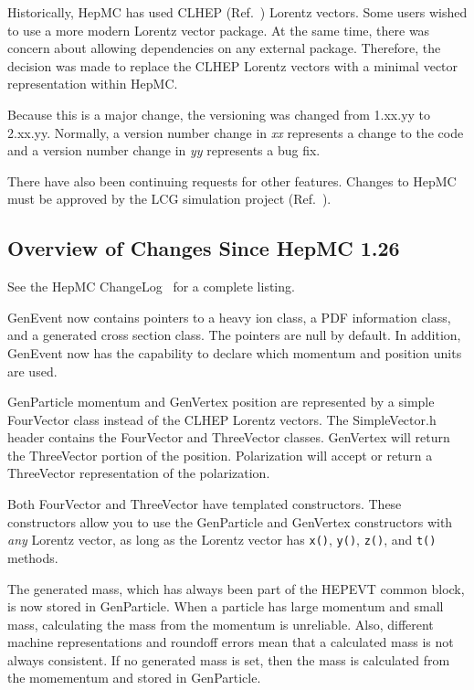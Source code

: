 \documentclass[11pt,letterpaper]{article}
\begin{document}
Historically, HepMC has used CLHEP (Ref.~\cite{clhep}) Lorentz vectors.  Some users wished to use
a more modern Lorentz vector package.  At the same time, 
there was concern about allowing dependencies on any external package.  
Therefore, the decision was made to replace the CLHEP Lorentz vectors with
a minimal vector representation within HepMC.  

Because this is a major change, the versioning was changed 
from 1.xx.yy to 2.xx.yy.  Normally, a version number change in \emph{xx} 
represents a change to the code and a version number change in \emph{yy}
represents a bug fix.

There have also been continuing requests for other features.
Changes to HepMC must be approved by the LCG simulation project 
(Ref.~\cite{lcgsim}).  

%
%

\subsection{Overview of Changes Since HepMC 1.26}

See the HepMC ChangeLog~\cite{changelog} for a complete listing.

GenEvent now contains pointers to a heavy ion class, a PDF information class,
and a generated cross section class.
The pointers are null by default.  
In addition, GenEvent now has the capability to declare which
momentum and position units are used.

GenParticle momentum and GenVertex position are represented by a simple FourVector 
class instead of the CLHEP Lorentz vectors.  
The SimpleVector.h header contains the FourVector and ThreeVector classes.
GenVertex will return the ThreeVector portion of the position.
Polarization will accept or return a ThreeVector representation 
of the polarization.

Both FourVector and ThreeVector have templated constructors.  
These constructors allow you to use the GenParticle and GenVertex constructors
with \emph{any} Lorentz vector, as long as the Lorentz vector has 
\verb!x()!, \verb!y()!, \verb!z()!, and \verb!t()! methods.

The generated mass, which has always been part of the HEPEVT common block, 
is now stored in GenParticle.  
When a particle has large momentum and small mass, 
calculating the mass from the momentum is unreliable.
Also, different machine representations and roundoff errors mean that
a calculated mass is not always consistent.
If no generated mass is set, then the mass is calculated from the momementum 
and stored in GenParticle.
\end{document}
